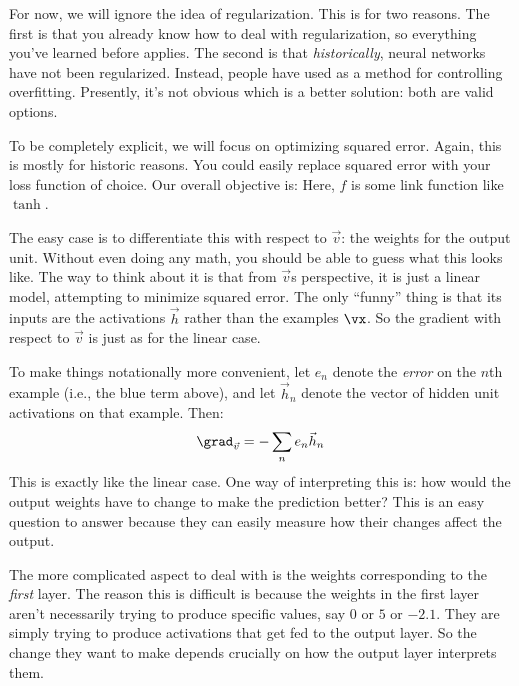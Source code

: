 For now, we will ignore the idea of regularization.  This is for two
reasons.  The first is that you already know how to deal with
regularization, so everything you've learned before applies.  The
second is that \emph{historically}, neural networks have not been
regularized.  Instead, people have used  as a
method for controlling overfitting.  Presently, it's not obvious which
is a better solution: both are valid options.

To be completely explicit, we will focus on optimizing squared error.
Again, this is mostly for historic reasons.  You could easily replace
squared error with your loss function of choice.  Our overall
objective is:
%
%
Here, $f$ is some link function like $\tanh$.

The easy case is to differentiate this with respect to $\vec v$: the
weights for the output unit.  Without even doing any math, you should
be able to guess what this looks like.  The way to think about it is
that from $\vec v$s perspective, it is just a linear model, attempting
to minimize squared error.  The only ``funny'' thing is that its
inputs are the activations $\vec h$ rather than the examples $\vx$.
So the gradient with respect to $\vec v$ is just as for the linear
case.

To make things notationally more convenient, let $e_n$ denote the
\emph{error} on the $n$th example (i.e., the blue term above), and let
$\vec h_n$ denote the vector of hidden unit activations on that
example.  Then:
%
\begin{equation}
\grad_{\vec v} = -\sum_n e_n \vec h_n
\end{equation}
%
This is exactly like the linear case.  One way of interpreting this
is: how would the output weights have to change to make the prediction
better?  This is an easy question to answer because they can easily
measure how their changes affect the output.

The more complicated aspect to deal with is the weights corresponding
to the \emph{first} layer.  The reason this is difficult is because
the weights in the first layer aren't necessarily trying to produce
specific values, say $0$ or $5$ or $-2.1$.  They are simply trying to
produce activations that get fed to the output layer.  So the change
they want to make depends crucially on how the output layer interprets
them.

